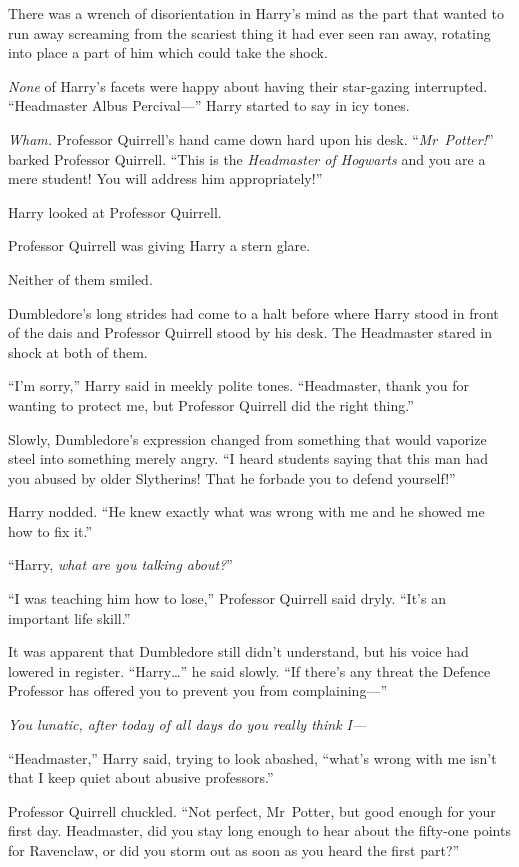 There was a wrench of disorientation in Harry’s mind as the part that wanted to run away screaming from the scariest thing it had ever seen ran away, rotating into place a part of him which could take the shock.

\emph{None} of Harry’s facets were happy about having their star-gazing interrupted.
“Headmaster Albus Percival—” Harry started to say in icy tones.

\emph{Wham.} Professor Quirrell’s hand came down hard upon his desk. “\emph{Mr~Potter!}” barked Professor Quirrell.
“This is the \emph{Headmaster of Hogwarts} and you are a mere student! You will address him appropriately!”

Harry looked at Professor Quirrell.

Professor Quirrell was giving Harry a stern glare.

Neither of them smiled.

Dumbledore’s long strides had come to a halt before where Harry stood in front of the dais and Professor Quirrell stood by his desk. The Headmaster stared in shock at both of them.

“I’m sorry,” Harry said in meekly polite tones.
“Headmaster, thank you for wanting to protect me, but Professor Quirrell did the right thing.”

Slowly, Dumbledore’s expression changed from something that would vaporize steel into something merely angry.
“I heard students saying that this man had you abused by older Slytherins! That he forbade you to defend yourself!”

Harry nodded.
“He knew exactly what was wrong with me and he showed me how to fix it.”

“Harry, \emph{what are you talking about?}”

“I was teaching him how to lose,” Professor Quirrell said dryly.
“It’s an important life skill.”

It was apparent that Dumbledore still didn’t understand, but his voice had lowered in register.
“Harry…” he said slowly.
“If there’s any threat the Defence Professor has offered you to prevent you from complaining—”

\emph{You lunatic, after today of all days do you really think I—}

“Headmaster,” Harry said, trying to look abashed, “what’s wrong with me isn’t that I keep quiet about abusive professors.”

Professor Quirrell chuckled.
“Not perfect, Mr~Potter, but good enough for your first day. Headmaster, did you stay long enough to hear about the fifty-one points for Ravenclaw, or did you storm out as soon as you heard the first part?”

